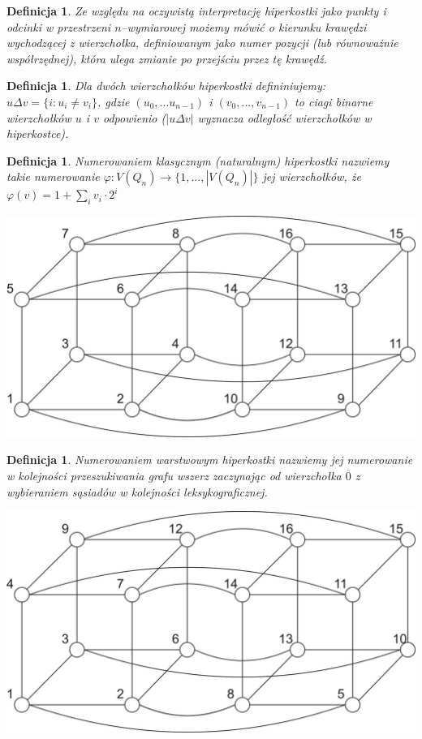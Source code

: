 \documentclass{pracamgr}
\newtheorem{defi}[theorem]{Definicja} %
\begin{document}
    \begin{defi}\label{kierunek krawędzi}
     Ze względu na oczywistą interpretację hiperkostki jako punkty i odcinki w przestrzeni $n$--wymiarowej możemy mówić o \emph{kierunku}
     krawędzi wychodzącej z wierzchołka, definiowanym jako numer pozycji (lub równoważnie współrzędnej), która ulega zmianie po przejściu przez tę krawędź.
    \end{defi}
    \begin{defi}\label{delta wierzcholkow}
     Dla dwóch wierzchołków hiperkostki defininiujemy:
     $u\Delta v=\{i:u_i\neq v_i\}$, gdzie $(u_0,...u_{n-1})$ i $(v_0,...,v_{n-1})$ to ciagi binarne wierzchołków $u$ i $v$ odpowienio
     ($|u\Delta v|$ wyznacza odległość wierzchołków w hiperkostce).
    \end{defi}
    \begin{defi}\label{numerowanie klasyczne}
     \emph{Numerowaniem klasycznym (naturalnym)} hiperkostki nazwiemy takie numerowanie $\varphi:V(Q_n)\rightarrow\{1,...,|V(Q_n)|\}$ jej wierzchołków, że
     $\varphi(v)=1+\sum_{i}v_i\cdot2^i$
    \end{defi}
    \begin{center}
     \includegraphics[scale=0.6]{img/Q_4_klasyczne.jpg}
    \end{center}
    \begin{defi}\label{numerowanie warstwowe}
     \emph{Numerowaniem warstwowym} hiperkostki nazwiemy jej numerowanie w kolejności przeszukiwania grafu wszerz zaczynając od wierzchołka $\overline{0}$
     z wybieraniem sąsiadów w kolejności leksykograficznej.
    \end{defi}
    \begin{center}
    \includegraphics[scale=0.6]{img/Q_4_warstwowe.jpg}
   \end{center}   
\end{document}
